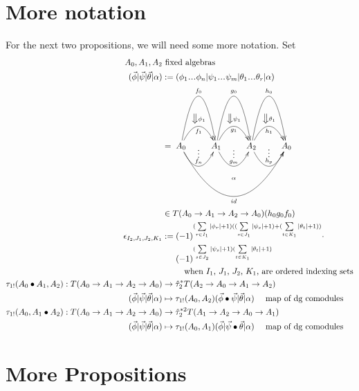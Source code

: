 \section{More notation}
For the next two propositions, we will need 
some more notation. Set
\begin{align*}
A_0, A_1, A_2
&\textrm{ fixed algebras}\\
(\vec{\phi} | \vec{\psi} | \vec{\theta}| \alpha) 
&:= 
(\phi_1\smdots\phi_n | \psi_1\smdots\psi_m| 
  \theta_1 \smdots \theta_r|\alpha)\\
&= 
\xymatrix{
A_0 \ar@/^5pc/[r]^{f_0} 
\ar@/^2pc/[r]^{\big\Downarrow \phi_1}_{f_1} 
\ar@/_2pc/[r]^{\substack{\vdots\\ f_n}}
\ar@/_5pc/[rrr]_{id}^{\substack{\alpha \\ \\ \\ \\ }}
& A_1 \ar@/^5pc/[r]^{g_0} 
\ar@/^2pc/[r]^{\big\Downarrow \psi_1}_{g_1} 
\ar@/_2pc/[r]^{\substack{\vdots\\ g_m}}
& A_2 \ar@/^5pc/[r]^{h_0} 
\ar@/^2pc/[r]^{\big\Downarrow \theta_1}_{h_1} 
\ar@/_2pc/[r]^{\substack{\vdots\\ h_p}}
& A_0
}\\
&\in 
T(A_0 \to A_1 \to A_2 \to A_0)(h_0g_0f_0)\\
\epsilon_{I_2,J_1,J_2,K_1} 
&:= 
(-1)^{(\sum \limits_{r \in I_1}|\phi_r|+1)
  ((\sum \limits_{s \in J_1}|\psi_s|+1) + 
  (\sum \limits_{t \in K_1}|\theta_t|+1))}\cdot\\
&\phantom{{}:={}} 
  (-1)^{(\sum \limits_{s \in J_2}|\psi_s|+1)
  (\sum \limits_{t \in K_1}|\theta_t|+1)}\\
&\phantom{{}:={}}  
  \quad \textrm{when $I_1$, $J_1$, $J_2$, $K_1$, 
  are ordered indexing sets}\\  
\tau_{1!}(A_0\bullet A_1, A_2):
  T(A_0 \to A_1 \to A_2 \to A_0) 
&\to
\hat{\tau}_2^*T(A_2 \to A_0 \to A_1 \to A_2)\\
(\vec{\phi} | \vec{\psi} | \vec{\theta}| \alpha) 
&\mapsto 
\tau_{1!}(A_0,A_2)
  (\vec{\phi} \bullet \vec{\psi} | \vec{\theta}| \alpha)
  \quad \textrm{ map of dg comodules}\\
\tau_{1!}(A_0,A_1\bullet A_2):
  T(A_0 \to A_1 \to A_2 \to A_0) 
&\to
\hat{\tau}_2^{*2}T(A_1 \to A_2 \to A_0 \to A_1)\\
(\vec{\phi} | \vec{\psi} | \vec{\theta}| \alpha) 
&\mapsto 
\tau_{1!}(A_0,A_1)
  (\vec{\phi}|\vec{\psi} \bullet \vec{\theta}| \alpha)
  \quad \textrm{ map of dg comodules}\\
\end{align*}

\section{More Propositions}

